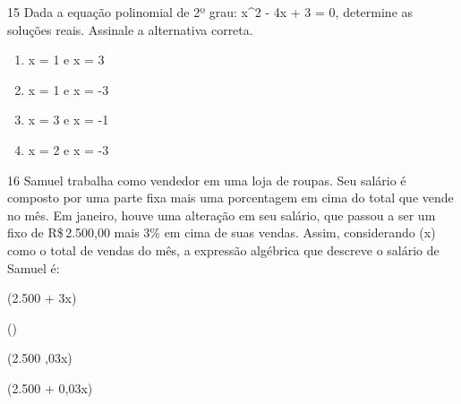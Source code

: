 




\num{15} Dada a equação polinomial de 2º grau: x^2 - 4x + 3 = 0, determine as
soluções reais. Assinale a alternativa correta.

\begin{enumerate}
\def\labelenumi{\alph{enumi})}
\item
  x = 1 e x = 3
\item
  x = 1 e x = -3
\item
  x = 3 e x = -1
\item
  x = 2 e x = -3
\end{enumerate}








\num{16} Samuel trabalha como vendedor em uma loja de roupas. Seu salário é
composto por uma parte fixa mais uma porcentagem em cima do total que
vende no mês. Em janeiro, houve uma alteração em seu salário, que passou
a ser um fixo de R\$\,2.500,00 mais 3\% em cima de suas vendas. Assim,
considerando (x) como o total de vendas do mês, a expressão algébrica
que descreve o salário de Samuel é:
\item (2.500 + 3x)
\item ()
\item (2.500 ,03x)
\item (2.500 + 0,03x)

